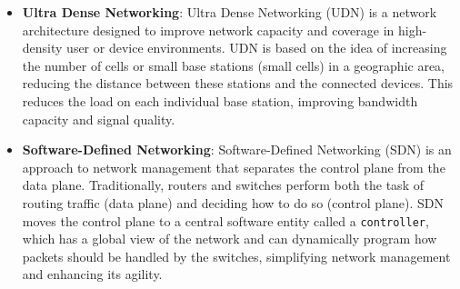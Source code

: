 \documentclass[english]{article}
\begin{document}
\begin{itemize}
	\item \textbf{Ultra Dense Networking}\hypertarget{UDN}{}:
	      Ultra Dense Networking (UDN) is a network architecture designed
	      to improve network capacity and coverage in high-density user or
	      device environments. UDN is based on the idea of increasing the
	      number of cells or small base stations (small cells) in a
	      geographic area, reducing the distance between these stations and
	      the connected devices. This reduces the load on each individual
	      base station, improving bandwidth capacity and signal quality.

	\item \textbf{\hypertarget{SDN}{Software-Defined Networking}}:
	      Software-Defined Networking (SDN) is an approach to network management that separates the control
	      plane from the data plane. Traditionally, routers and switches perform both the task of routing
	      traffic (data plane) and deciding how to do so (control plane). SDN moves the control plane to a
	      central software entity called a \texttt{controller}, which has a global view of the network and
	      can dynamically program how packets should be handled by the switches, simplifying network
	      management and enhancing its agility.


\end{itemize}
\end{document}
